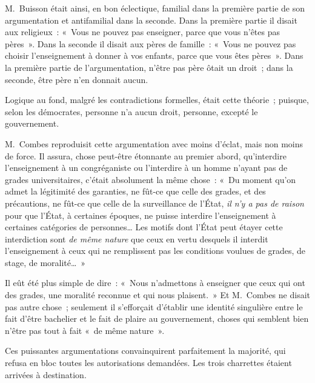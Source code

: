 \documentclass[french,twoside]{book} %
\newcommand{\astertri}{\medskip\par\centerline{\color{rubric}\large\selectfont{\syms ✻\,✻\,✻}}\medskip\par}%
\begin{document}
 M. Buisson était ainsi, en bon éclectique, familial dans la première partie de son argumentation et antifamilial dans la seconde. Dans la première partie il disait aux religieux : « Vous ne pouvez pas enseigner, parce que vous n’êtes pas pères ». Dans la seconde il disait aux pères de famille : « Vous ne pouvez pas choisir l’enseignement à donner à vos enfants, parce que vous êtes pères ». Dans la première partie de l’argumentation, n’être pas père ôtait un droit ; dans la seconde, être père n’en donnait aucun.\par
Logique au fond, malgré les contradictions formelles, était cette théorie ; puisque, selon les démocrates, personne n’a aucun droit, personne, excepté le gouvernement.\par
M. Combes reproduisit cette argumentation avec moins d’éclat, mais non moins de force. Il assura, chose peut-être étonnante au premier abord, qu’interdire l’enseignement à un congréganiste ou l’interdire à un homme n’ayant pas de grades universitaires, c’était absolument la même chose : « Du moment qu’on admet la légitimité des garanties, ne fût-ce que celle des grades, et des précautions, ne fût-ce que celle de la surveillance de l’État, {\itshape il n’y a pas de raison} pour que l’État, à certaines époques, ne puisse interdire l’enseignement à certaines catégories de personnes… Les motifs dont  l’État peut étayer cette interdiction sont {\itshape de même nature} que ceux en vertu desquels il interdit l’enseignement à ceux qui ne remplissent pas les conditions voulues de grades, de stage, de moralité… »\par
Il eût été plus simple de dire : « Nous n’admettons à enseigner que ceux qui ont des grades, une moralité reconnue et qui nous plaisent. » Et M. Combes ne disait pas autre chose ; seulement il s’efforçait d’établir une identité singulière entre le fait d’être bachelier et le fait de plaire au gouvernement, choses qui semblent bien n’être pas tout à fait « de même nature ».\par
Ces puissantes argumentations convainquirent parfaitement la majorité, qui refusa en bloc toutes les autorisations demandées. Les trois charrettes étaient arrivées à destination.\par

\astertri
\end{document}

